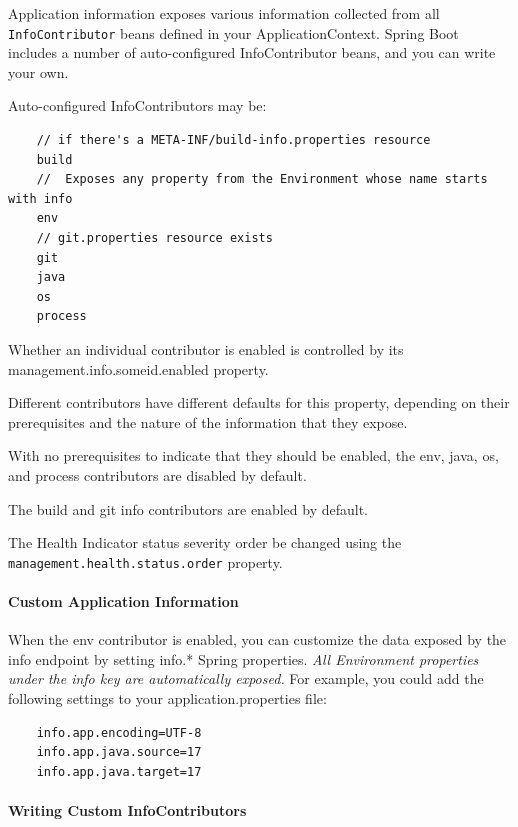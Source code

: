\documentclass{scrartcl}
\begin{document}
Application information exposes various information collected from all \lstinline|InfoContributor| beans defined in your ApplicationContext. Spring Boot includes a number of auto-configured InfoContributor beans, and you can write your own.

Auto-configured InfoContributors may be:

\begin{lstlisting}
    // if there's a META-INF/build-info.properties resource
    build
    //  Exposes any property from the Environment whose name starts with info
    env
    // git.properties resource exists
    git
    java
    os
    process
\end{lstlisting}

Whether an individual contributor is enabled is controlled by its management.info.someid.enabled property.

Different contributors have different defaults for this property, depending on their prerequisites and the nature of the information that they expose.

With no prerequisites to indicate that they should be enabled, the env, java, os, and process contributors are disabled by default.

The build and git info contributors are enabled by default.

The Health Indicator status severity order be changed using the \lstinline|management.health.status.order| property.

\paragraph{Custom Application Information}

When the env contributor is enabled, you can customize the data exposed by the info endpoint by setting info.* Spring properties. \textit{All Environment properties under the info key are automatically exposed.} For example, you could add the following settings to your application.properties file:

    \begin{lstlisting}
    info.app.encoding=UTF-8
    info.app.java.source=17
    info.app.java.target=17

    \end{lstlisting}

\paragraph{Writing Custom InfoContributors}
\end{document}
